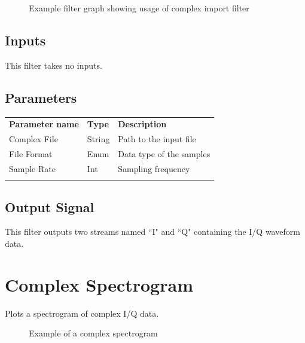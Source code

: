 \begin{figure}[h]
\centering
{}
\caption{Example filter graph showing usage of complex import filter}
\label{filter_compleximport_graph}
\end{figure}

\FloatBarrier

\subsection{Inputs}

This filter takes no inputs.

\subsection{Parameters}

\begin{tabularx}{16cm}{llX}
\thickhline
\textbf{Parameter name} & \textbf{Type} & \textbf{Description} \\
\thickhline
Complex File & String & Path to the input file\\
\thinhline
File Format & Enum & Data type of the samples\\
\thinhline
Sample Rate & Int & Sampling frequency\\
\thickhline
\end{tabularx}

\subsection{Output Signal}

This filter outputs two streams named ``I" and ``Q" containing the I/Q waveform data.

\pagebreak
\section{Complex Spectrogram}
\label{filter:complexspectrogram}

Plots a spectrogram of complex I/Q data.

\begin{figure}[h]
\centering
{}
\caption{Example of a complex spectrogram}
\label{filter_complexspectrogram}
\end{figure}

